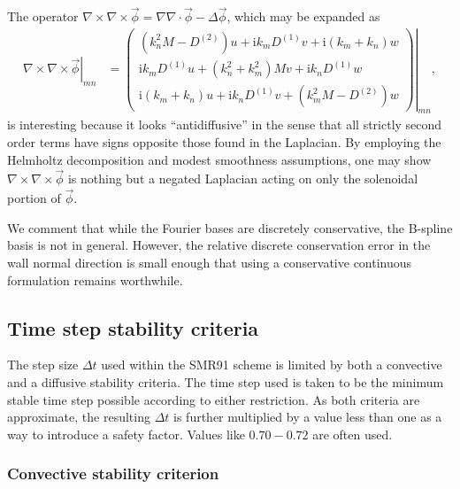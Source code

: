 \documentclass[letterpaper,11pt,nointlimits,reqno,draft]{amsart}
\newcommand{\ii}{\ensuremath{\mathrm{i}}}
\begin{document}
The operator $\nabla\times\nabla\times\vec{\phi} = \nabla\nabla\cdot\vec{\phi}
- \Delta\vec{\phi}$, which may be expanded as
\begin{align}
  \left.\nabla\times\nabla\times\vec{\phi}\right|_{m n}
&=
  \left.\begin{pmatrix}
    \left(k_n^2 M - D^{(2)}\right) u + \ii k_m D^{(1)} v + \ii \left(k_m+k_n\right) w \\
    \ii k_m D^{(1)} u + \left(k_n^2 + k_m^2\right)Mv + \ii k_n D^{(1)} w \\
    \ii \left(k_m + k_n\right) u + \ii k_n D^{(1)} v + \left(k_m^2 M - D^{(2)}\right) w
  \end{pmatrix}\right|_{m n}
  ,
\end{align}
is interesting because it looks ``antidiffusive'' in the sense that all
strictly second order terms have signs opposite those found in the Laplacian.
By employing the Helmholtz decomposition and modest smoothness assumptions, one
may show $\nabla\times\nabla\times\vec{\phi}$ is nothing but a negated
Laplacian acting on only the solenoidal portion of $\vec{\phi}$.

We comment that while the Fourier bases are discretely conservative, the
B-spline basis is not in general.  However, the relative discrete conservation
error in the wall normal direction is small enough that using a conservative
continuous formulation remains worthwhile.

\subsection{Time step stability criteria}
\label{sec:stabilitycriteria}

The step size $\Delta{}t$ used within the SMR91 scheme is limited by both a
convective and a diffusive stability criteria.  The time step used is taken to
be the minimum stable time step possible according to either restriction.  As
both criteria are approximate, the resulting $\Delta{}t$ is further multiplied
by a value less than one as a way to introduce a safety factor.  Values like
$0.70-0.72$ are often used.

\subsubsection{Convective stability criterion}
\label{sec:convectivestability}
\end{document}
